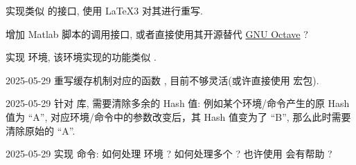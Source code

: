 \documentclass[
  hyper, 
  lang = cn, 
  class = l3doc,
  classOption={11pt},
  sect = {load=false},
]{../../zlatex/code/ztex}
\begin{document}
\let\olditem\item
{}
  {
      {\color{black}%
        \olditem{}\color{gray}}
      {\color{black}%
        \olditem}
  }
\begin{todolist}
  \item 实现类似  的接口, 使用 \LaTeX3 对其进行重写.
  \item *[参考后续 ``\env{wolframAny}'' 环境的处理方法]增加 Matlab 脚本的调用接口, 或者直接使用其开源替代 \href{https://octave.org/}{GNU Octave} ?
  \item *[参考 \pkg{cache} 库一节中 ``\env{mermaid}'' 环境的实现]实现  环境, 该环境实现的功能类似 .
  \item [2025-05-29]重写缓存机制对应的函数 , 目前不够灵活(或许直接使用 \href{https://github.com/leo-colisson/robust-externalize}{} 宏包).
  \item [2025-05-29]针对  库, 需要清除多余的 Hash 值: 例如某个环境/命令产生的原 Hash 值为 ``A'', 对应环境/命令中的参数改变后，其 Hash 值变为了 ``B'', 那么此时需要清除原始的 ``A''.
  \item [2025-05-29]实现  命令: 如何处理  环境 ? 如何处理多个  ? 也许使用  会有帮助 ?
\end{todolist}


\tikzexternaldisable
{}
\ztexDocPrintSource


\renewcommand\indexname{索引}
\PrintIndex
\end{document}
